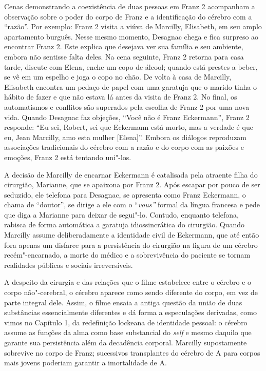 Cenas demonstrando a coexistência de duas pessoas em Franz 2 acompanham
a observação sobre o poder do corpo de Franz e a identificação do
cérebro com a ``razão''. Por exemplo: Franz 2 visita a viúva de
Marcilly, Elisabeth, em seu amplo apartamento burguês. Nesse mesmo
momento, Desagnac chega e fica surpreso ao encontrar Franz 2. Este
explica que desejava ver sua família e seu ambiente, embora não sentisse
falta deles. Na cena seguinte, Franz 2 retorna para casa tarde, discute
com Elena, enche um copo de álcool; quando está prestes a beber, se vê
em um espelho e joga o copo no chão. De volta à casa de Marcilly,
Elisabeth encontra um pedaço de papel com uma garatuja que o marido
tinha o hábito de fazer e que não estava lá antes da visita de Franz 2.
No final, os automatismos e conflitos são superados pela escolha de
Franz 2 por uma nova vida. Quando Desagnac faz objeções, ``Você não é
Franz Eckermann'', Franz 2 responde: ``Eu sei, Robert, sei que Eckermann
está morto, mas a verdade é que eu, Jean Marcilly, amo esta mulher
{[}Elena{]}''. Embora os diálogos reproduzam associações tradicionais do
cérebro com a razão e do corpo com as paixões e emoções, Franz 2 está
tentando uni"-los.

A decisão de Marcilly de encarnar Eckermann é catalisada pela atraente
filha do cirurgião, Marianne, que se apaixona por Franz 2. Após escapar
por pouco de ser seduzido, ele telefona para Desagnac, se apresenta como
Franz Eckermann, o chama de ``doutor'', se dirige a ele com o
``\emph{vous''} formal da língua francesa e pede que diga a Marianne
para deixar de segui"-lo. Contudo, enquanto telefona, rabisca de forma
automática a garatuja idiossincrática do cirurgião. Quando Marcilly
assume deliberadamente a identidade civil de Eckermann, que até então
fora apenas um disfarce para a persistência do cirurgião na figura de um
cérebro recém"-encarnado, a morte do médico e a sobrevivência do paciente
se tornam realidades públicas e sociais irreversíveis.

A despeito da cirurgia e das relações que o filme estabelece entre o
cérebro e o corpo não"-cerebral, o cérebro aparece como sendo diferente
do corpo, em vez de parte integral dele. Assim, o filme ensaia a antiga
questão da união de duas substâncias essencialmente diferentes e dá
forma a especulações derivadas, como vimos no Capítulo 1, da redefinição
lockeana de identidade pessoal: o cérebro assume as funções da alma como
base substancial do \emph{self} e mesmo daquilo que garante sua persistência
além da decadência corporal. Marcilly supostamente sobrevive no corpo de
Franz; sucessivos transplantes do cérebro de A para corpos mais jovens
poderiam garantir a imortalidade de A.

